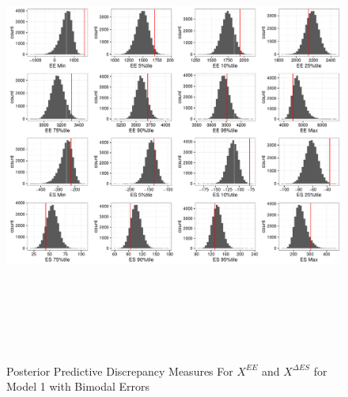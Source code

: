\documentclass[11pt]{article}\usepackage[]{graphicx}\usepackage[]{color}
\begin{document}
 \begin{figure}
  \centering
  \includegraphics[width=17cm,height=15cm]{manual_figure/wpxdiag1b.pdf}
  \caption{Posterior Predictive Discrepancy Measures For $X^{EE}$ and $X^{\Delta ES}$ for Model 1 with Bimodal  Errors}
  \label{wpxdiag1b}
  \end{figure}
\end{document}
